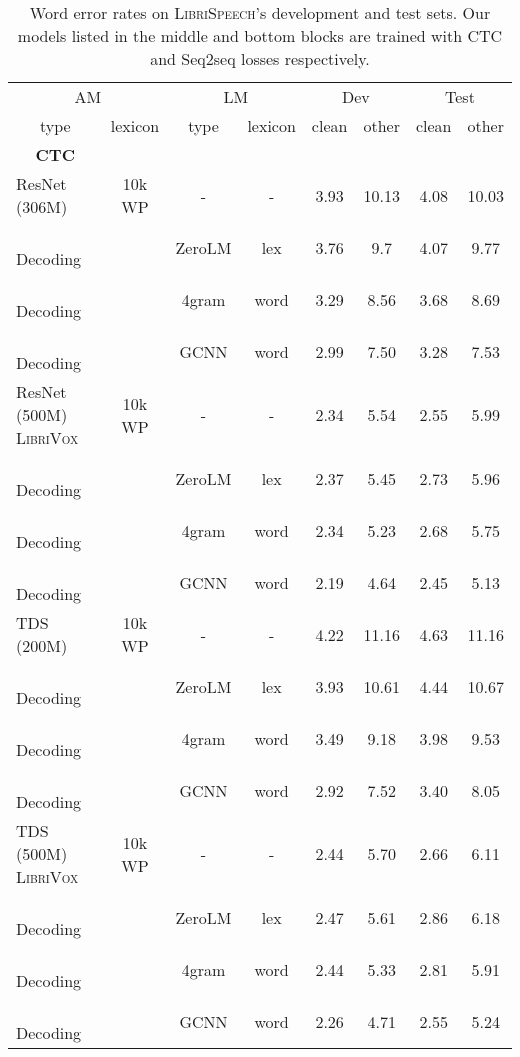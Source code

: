 \documentclass{article}
\newcommand{\librivox}{\textsc{LibriVox}}
\newcommand{\librispeech}{\textsc{LibriSpeech}}
\begin{document}
\appendix

\begin{table*}[!t]
\caption{Word error rates on \librispeech's development and test sets. Our models listed in the middle and bottom blocks are trained with CTC and Seq2seq losses respectively.\label{tab:libriWERAppendix}}
\begin{small}
    \centering
    \begin{sc}
    \begin{tabular}{lccccccc}
    \toprule
       \multicolumn{2}{c}{AM} & \multicolumn{2}{c}{LM} & \multicolumn{2}{c}{Dev} & \multicolumn{2}{c}{Test} \\
    \cmidrule(lr){1-2} \cmidrule(lr){3-4} \cmidrule(lr){5-6} \cmidrule(lr){7-8}
        \multicolumn{1}{c}{type} & lexicon & type  & lexicon& clean & other & clean & other \\
    \midrule
      \multicolumn{1}{c}{ \textbf{CTC} } & \\
    ResNet (306M) & 10k WP & - & - & 3.93 & 10.13 & 4.08 & 10.03 \\
    ~~ Decoding & & ZeroLM & lex & 3.76 & 9.7 & 4.07 & 9.77 \\
    ~~ Decoding & & 4gram & word & 3.29 & 8.56 & 3.68 & 8.69 \\
    ~~ Decoding & & GCNN & word & 2.99 & 7.50 & 3.28 & 7.53 \\
ResNet (500M) \librivox~& 10k WP & - & - & 2.34 & 5.54 & 2.55 & 5.99 \\
    ~~ Decoding & & ZeroLM & lex & 2.37 & 5.45 & 2.73 & 5.96 \\
    ~~ Decoding & & 4gram & word & 2.34 & 5.23 & 2.68 & 5.75 \\
    ~~ Decoding & & GCNN & word & 2.19 & 4.64 & 2.45 & 5.13 \\
    \cmidrule(lr){1-1}
    TDS (200M) & 10k WP & - & - & 4.22 & 11.16 & 4.63 & 11.16 \\
    ~~ Decoding & & ZeroLM & lex & 3.93 & 10.61 & 4.44 & 10.67 \\
    ~~ Decoding & & 4gram & word & 3.49 & 9.18 & 3.98 & 9.53 \\
    ~~ Decoding & & GCNN & word & 2.92 & 7.52 & 3.40 & 8.05 \\
TDS (500M) \librivox~& 10k WP & - & - & 2.44 & 5.70 & 2.66 & 6.11 \\
    ~~ Decoding & & ZeroLM & lex & 2.47 & 5.61 & 2.86 & 6.18 \\
    ~~ Decoding & & 4gram & word & 2.44 & 5.33 & 2.81 & 5.91 \\
    ~~ Decoding & & GCNN & word & 2.26 & 4.71 & 2.55 & 5.24 \\

\end{tabular}
\end{sc}
\end{small}
\end{table*}
\end{document}
